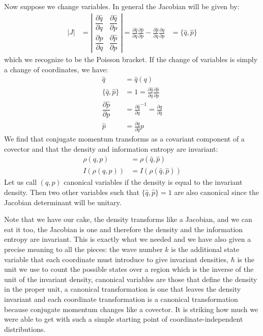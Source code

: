 \documentclass[11pt]{article}
\begin{document}
Now suppose we change variables. In general the Jacobian will be given by:
\begin{equation}
\label{Poisson}
\begin{aligned}
|J| &= \left| \begin{matrix}
\dfrac{\partial \hat{q}}{\partial q} & \dfrac{\partial \hat{q}}{\partial p} \\[2.2ex]
\dfrac{\partial \hat{p}}{\partial q} & \dfrac{\partial \hat{p}}{\partial p} \end{matrix} \right| = \frac{\partial \hat{q}}{\partial q} \frac{\partial \hat{p}}{\partial p} - \frac{\partial \hat{p}}{\partial q} \frac{\partial \hat{q}}{\partial p} &= \{\hat{q}, \hat{p}\}
\end{aligned}
\end{equation}
which we recognize to be the Poisson bracket. If the change of variables is simply a change of coordinates, we have:
\begin{equation}
\label{coordinate_change}
\begin{aligned}
\hat{q} &= \hat{q}(q) \\
\{\hat{q}, \hat{p}\} &= 1 = \frac{\partial \hat{q}}{\partial q} \frac{\partial \hat{p}}{\partial p} \\
\dfrac{\partial \hat{p}}{\partial p} &= \frac{\partial \hat{q}}{\partial q} ^{-1} = \frac{\partial q}{\partial \hat{q}} \\
\hat{p} &= \frac{\partial q}{\partial \hat{q}} p
\end{aligned}
\end{equation}
We find that conjugate momentum transforms as a covariant component of a covector and that the density and information entropy are invariant:
\begin{equation}
\label{density_invariance}
\begin{aligned}
\rho(q,p) &= \rho(\hat{q}, \hat{p}) \\
I(\rho(q,p)) &= I(\rho(\hat{q},\hat{p}))
\end{aligned}
\end{equation}
Let us call $(q,p)$ canonical variables if the density is equal to the invariant density. Then two other variables such that $\{\hat{q}, \hat{p}\}=1$ are also canonical since the Jacobian determinant will be unitary.

Note that we have our cake, the density transforms like a Jacobian, and we can eat it too, the Jacobian is one and therefore the density and the information entropy are invariant. This is exactly what we needed and we have also given a precise meaning to all the pieces: the wave number $k$ is the additional state variable that each coordinate must introduce to give invariant densities, $\hbar$ is the unit we use to count the possible states over a region which is the inverse of the unit of the invariant density, canonical variables are those that define the density in the proper unit, a canonical transformation is one that leaves the density invariant and each coordinate transformation is a canonical transformation because conjugate momentum changes like a covector. It is striking how much we were able to get with such a simple starting point of coordinate-independent distributions.
\end{document}
